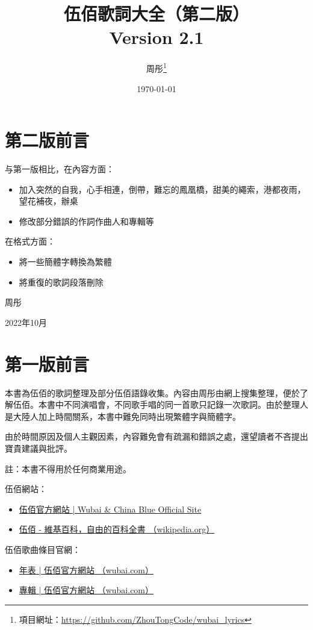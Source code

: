 \documentclass[UTF8,a4paper,oneside,twocolumn,12pt]{ctexbook}
\title{伍佰歌詞大全（第二版）\\ Version 2.1}
\author{周彤\thanks{項目網址：\url{https://github.com/ZhouTongCode/wubai_lyrics}}}
\date{\today}
\begin{document}
\frontmatter
\maketitle

\onecolumn

\chapter*{第二版前言}
与第一版相比，在內容方面：
\begin{itemize}
	\item 加入突然的自我，心手相連，倒帶，難忘的鳳凰橋，甜美的繩索，港都夜雨，望花補夜，辦桌
	\item 修改部分錯誤的作詞作曲人和專輯等
\end{itemize}

在格式方面：
\begin{itemize}
	\item 將一些簡體字轉換為繁體
	\item 將重復的歌詞段落刪除
\end{itemize}

\begin{flushright}
	周彤

	2022年10月
\end{flushright}

\chapter*{第一版前言}
本書為伍佰的歌詞整理及部分伍佰語錄收集。內容由周彤由網上搜集整理，便於了解伍佰。本書中不同演唱會，不同歌手唱的同一首歌只記錄一次歌詞。由於整理人是大陸人加上時間關系，本書中難免同時出現繁體字與簡體字。

由於時間原因及個人主觀因素，內容難免會有疏漏和錯誤之處，還望讀者不吝提出寶貴建議與批評。

註：本書不得用於任何商業用途。

伍佰網站：
\begin{itemize}
	\item \href{http://wubai.com/}{伍佰官方網站 | Wubai \& China Blue Official Site}
	\item \href{https://zh.wikipedia.org/zh-tw/伍佰}{伍佰 - 維基百科，自由的百科全書 （wikipedia.org）}
\end{itemize}

伍佰歌曲條目官網：
\begin{itemize}
	\item \href{http://wubai.com/biography/年表/}{年表 | 伍佰官方網站 （wubai.com）}
	\item \href{http://wubai.com/discography/專輯/}{專輯 | 伍佰官方網站 （wubai.com）}
\end{itemize}
\end{document}
